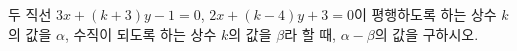 두 직선 $3x+(k+3)y-1=0$, $2x+(k-4)y+3=0$이 평행하도록 하는 상수 $k$의 값을 $\alpha$, 수직이 되도록 하는 상수 $k$의 값을 $\beta$라 할 때, $\alpha-\beta$의 값을 구하시오. 
